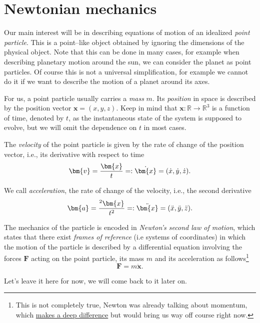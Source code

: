 \documentclass[english,fontsize=11pt,paper=a5,oneside]{scrbook}
\newcommand{\R}{\mathbb{R}}
\newcommand{\bx}{\bm{x}}
\newcommand{\bv}{\bm{v}}
\let\d\relax
\newcommand{\d}{\mathrm{d}}
\newcommand{\der}[2]{\frac{\d{#1}}{\d{#2}}}
\theoremstyle{definition}
\begin{document}
\section{Newtonian mechanics}

Our main interest will be in describing equations of motion of an idealized \emph{point particle}.
This is a point--like object obtained by ignoring the dimensions of the physical object. Note that this can be done in many cases, for example when describing planetary motion around the sun, we can consider the planet as point particles.
Of course this is not a universal simplification, for example we cannot do it if we want to describe the motion of a planet around its axes.

For us, a point particle usually carries a \emph{mass} $m$.
Its \emph{position} in space is described by the position vector $\bx = (x, y ,z)$.
Keep in mind that $\bx : \R\to\R^3$ is a function of time, denoted by $t$, as the instantaneous state of the system is supposed to evolve, but we will omit the dependence on $t$ in most cases.

The \emph{velocity} of the point particle is given by the rate of change of the position vector, i.e., its derivative with respect to time
\begin{equation}
  \bv = \der{\bx}{t} =: \dot{\bx} = (\dot{x}, \dot{y}, \dot{z}).
\end{equation}

We call \emph{acceleration}, the rate of change of the velocity, i.e., the second derivative
\begin{equation}
  \bm{a} = \der{^2\bx}{t^2} =: \ddot{\bx} = (\ddot{x}, \ddot{y}, \ddot{z}).
\end{equation}

\begin{tcolorbox}
  The mechanics of the particle is encoded in \emph{Newton's second law of motion}, which states that there exist \emph{frames of reference} (i.e systems of coordinates) in which the motion of the particle is described by a differential equation involving the forces $\bm{F}$ acting on the point particle, its mass $m$ and its acceleration as follows\footnote{This is not completely true, Newton was already talking about momentum, which \href{https://web.archive.org/web/20211201082909/https://bigthink.com/starts-with-a-bang/most-important-equation-physics/}{makes a deep difference} but would bring us way off course right now.}
  \begin{equation}\label{eq:newton}
    \bm F = m \ddot{\bx}.
  \end{equation}
\end{tcolorbox}
Let's leave it here for now, we will come back to it later on.
\medskip
\end{document}
